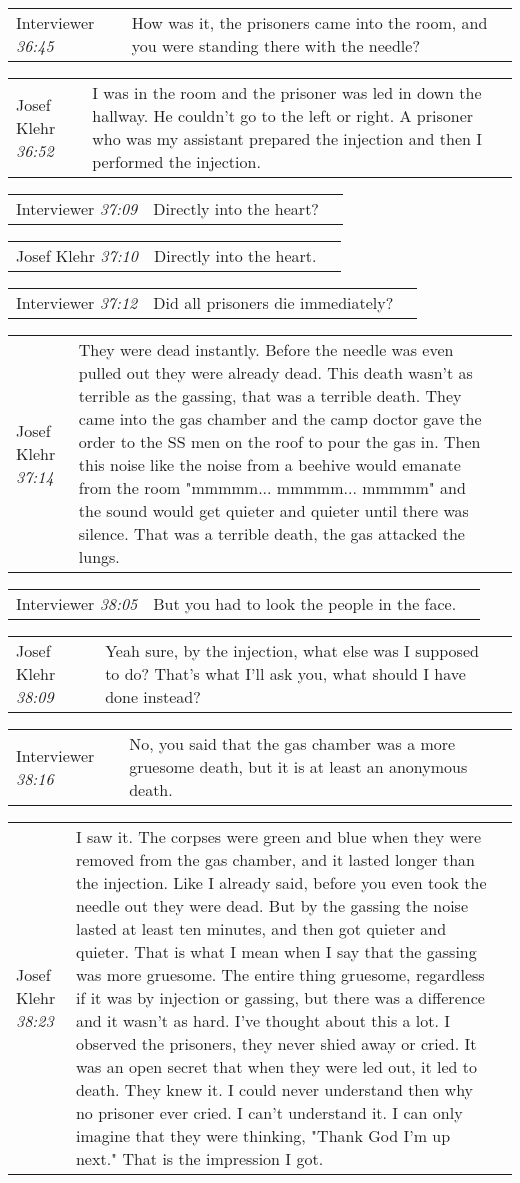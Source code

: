 \documentclass{article}
\newcommand{\I}{Interviewer}
\newcommand{\JK}{Josef Klehr}
\newcommand{\dialogueentry}[4]{
    \begin{center}
    \begin{tabular}{p{1in} p{3.5in} p{1.5in}} 
        #2 \newline \textit{#1} & #3 & \small{#4} 
    \end{tabular}
    \end{center}
}
\newcommand{\twolinebreak}{\newline \newline}
\begin{document}
\dialogueentry{36:45}{\I}{How was it, the prisoners came into the room, and you were standing there with the needle?}{}

\dialogueentry{36:52}{\JK}{I was in the room and the prisoner was led in down the hallway. He couldn't go to the left or right. A prisoner who was my assistant prepared the injection and then I performed the injection.}{}

\dialogueentry{37:09}{\I}{Directly into the heart?}{}

\dialogueentry{37:10}{\JK}{Directly into the heart.}{}

\dialogueentry{37:12}{\I}{Did all prisoners die immediately?}{}

\dialogueentry{37:14}{\JK}{They were dead instantly. Before the needle was even pulled out they were already dead. This death wasn't as terrible as the gassing, that was a terrible death. They came into the gas chamber and the camp doctor gave the order to the SS men on the roof to pour the gas in. Then this noise like the noise from a beehive would emanate from the room "mmmmm... mmmmm... mmmmm" and the sound would get quieter and quieter until there was silence. That was a terrible death, the gas attacked the lungs.}{}

\dialogueentry{38:05}{\I}{But you had to look the people in the face.}{}

\dialogueentry{38:09}{\JK}{Yeah sure, by the injection, what else was I supposed to do? That's what I'll ask you, what should I have done instead?}{}

\dialogueentry{38:16}{\I}{No, you said that the gas chamber was a more gruesome death, but it is at least an anonymous death.}{}

\dialogueentry{38:23}{\JK}{I saw it. The corpses were green and blue when they were removed from the gas chamber, and it lasted longer than the injection. Like I already said, before you even took the needle out they were dead. But by the gassing the noise lasted at least ten minutes, and then got quieter and quieter. That is what I mean when I say that the gassing was more gruesome.
\twolinebreak
The entire thing gruesome, regardless if it was by injection or gassing, but there was a difference and it wasn't as hard. I've thought about this a lot. I observed the prisoners, they never shied away or cried. It was an open secret that when they were led out, it led to death. They knew it. I could never understand then why no prisoner ever cried. I can't understand it. I can only imagine that they were thinking, "Thank God I'm up next." That is the impression I got.}{}
\end{document}
